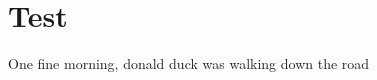 \documentclass{mimosis}
\begin{document}
\frontmatter
  
  

  \tableofcontents

\mainmatter
\chapter{Test}
One fine morning, donald duck was walking down the road \cite{}

  

\backmatter

  \printindex
  \printbibliography
\end{document}
